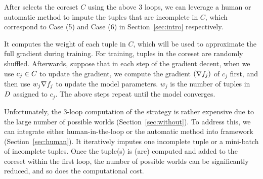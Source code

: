  After \ours selects the coreset $C$ using the above 3 loops, we can leverage a human or automatic method to impute the tuples that are incomplete in $C$, which correspond to Case (5) and Case (6) in Section~\ref{sec:intro} respectively. 




 It computes the weight of each tuple in $C$, which will be used to approximate the full gradient during training. For training, tuples in the coreset are randomly shuffled. Afterwards, suppose that in each step of the gradient decent, when we use $c_j \in C$ to update the gradient, we compute the gradient $(\nabla f_j)$ of $c_j$ first, and then use $w_j\nabla f_j$ to update the model parameters. $w_j$ is the number of tuples in $D$ assigned to $c_j$.  The above steps repeat until the model converges.


 Unfortunately, the 3-loop computation of the strategy is rather expensive due to the large number of possible worlds (Section~\ref{sec:without}).   To address this, we can   integrate either human-in-the-loop or the automatic method into \ours framework (Section~\ref{sec:human}).  It iteratively imputes one incomplete tuple or a mini-batch of incomplete tuples. Once the tuple(s) is (are) computed and added to the coreset within the first loop, the number of possible worlds can be significantly reduced, and so does the computational cost. %



   














